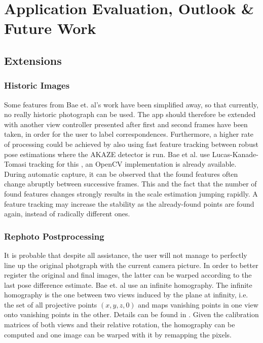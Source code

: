 \chapter{Application Evaluation, Outlook \& Future Work}\label{ch:outlook}

\section{Extensions}

\subsection{Historic Images}

Some features from Bae et. al's work have been simplified away, so that
currently, no really historic photograph can be used. The app should therefore
be extended with another view controller presented after first and second frames
have been taken, in order for the user to label correspondences. Furthermore, a
higher rate of processing could be achieved by also using fast feature tracking
between robust pose estimations where the AKAZE detector is run. Bae et al. use
Lucas-Kanade-Tomasi tracking for this \citep{lucas1981,tomasi1991}, an OpenCV
implementation is already available. During automatic capture, it can be
observed that the found features often change abruptly between successive
frames. This and the fact that the number of found features changes strongly
results in the scale estimation jumping rapidly. A feature tracking may increase
the stability as the already-found points are found again, instead of radically
different ones.

\subsection{Rephoto Postprocessing}

It is probable that despite all assistance, the user will not manage to
perfectly line up the original photgraph with the current camera picture.  In
order to better register the original and final images, the latter can be warped
according to the last pose difference estimate. Bae et. al use an infinite
homography. The infinite homography is the one between two views induced by the
plane at infinity, i.e.  the set of all projective points $(x,y,z,0)$ and maps
vanishing points in one view onto vanishing points in the other. Details can be
found in \citep[ch. 13.4]{h&z2004}.  Given the calibration matrices of both
views and their relative rotation, the homography can be computed and one image
can be warped with it by remapping the pixels.

